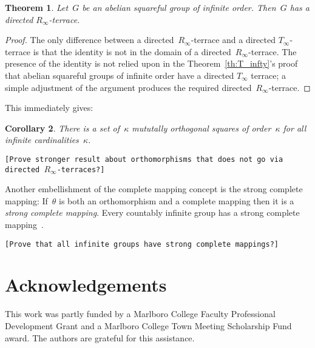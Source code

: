 \documentclass[12pt,a4paper]{article}
\newtheorem{thm}{Theorem}[section]
\newtheorem{cor}[thm]{Corollary}
\begin{document}
\begin{thm}\label{th:R_infty}
Let~$G$ be an abelian squareful group of infinite order.   Then~$G$ has a directed $R_{\infty}$-terrace.
\end{thm}

\begin{proof}
The only difference between a directed~$R_{\infty}$-terrace and a directed $T_{\infty}$-terrace is that the identity is not in the domain of a directed~$R_{\infty}$-terrace.  The presence of the identity is not relied upon in the Theorem~\ref{th:T_infty}'s proof that abelian squareful groups of infinite order have a  directed $T_{\infty}$ terrace; a simple adjustment of the argument produces the required directed~$R_{\infty}$-terrace.
\end{proof}

This immediately gives:

\begin{cor}
There is a set of~$\kappa$ mututally orthogonal squares of order~$\kappa$ for all infinite cardinalities~$\kappa$.
\end{cor}


\texttt{[Prove stronger result about orthomorphisms that does not go via directed $R_{\infty}$-terraces?]}





Another embellishment of the complete mapping concept is the strong complete mapping:
If~$\theta$ is both an orthomorphism and a complete mapping then it is a {\em strong complete mapping}.  Every countably infinite group has a strong complete mapping~\cite{Evans12}.

\texttt{[Prove that all infinite groups have strong complete mappings?]}





\section*{Acknowledgements}

This work was partly funded by a Marlboro College Faculty Professional Development Grant and a Marlboro College Town Meeting Scholarship Fund award.  The authors are grateful for this assistance.
\end{document}
